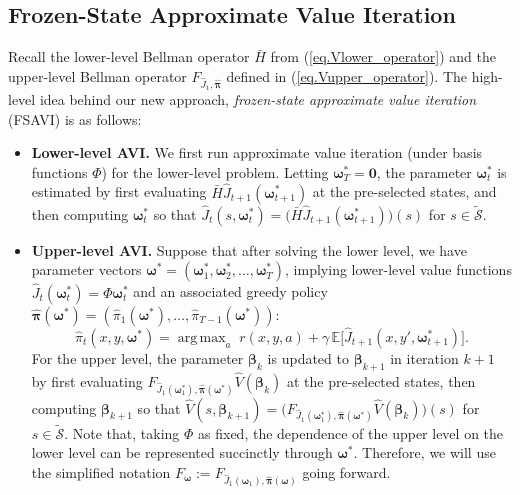 \documentclass[11pt, notitlepage]{article}
\DeclareMathOperator*{\argmax}{arg\,max}
\newcommand{\E}{\mathbb{E}}
\newcommand{\1}{\mathbbm{1}}
\begin{document}
\subsection{Frozen-State Approximate Value Iteration}
Recall the lower-level Bellman operator $\bar{H}$ from (\ref{eq.Vlower_operator}) and the upper-level Bellman operator $F_{\hat{J}_1, \hat{\boldsymbol{\pi}}}$ defined in (\ref{eq.Vupper_operator}). The high-level idea behind our new approach, \emph{frozen-state approximate value iteration} (FSAVI) is as follows:
\begin{itemize}
\item \textbf{Lower-level AVI.} We first run approximate value iteration (under basis functions $\Phi$) for the lower-level problem. Letting $\boldsymbol{\omega}_T^* = \mathbf{0}$, the parameter $\boldsymbol{\omega}^*_t$ is estimated by first evaluating $\bar{H} \hat{J}_{t+1}(\boldsymbol{\omega}_{t+1}^*) $ at the pre-selected states, and then computing $\boldsymbol{\omega}_t^*$ so that $\hat{J}_t(s,\boldsymbol{\omega}_t^*) = \bigl(\bar{H} \hat{J}_{t+1}(\boldsymbol{\omega}_{t+1}^*) \bigr) (s)$ for $s\in \tilde{\mathcal{S}}$.
\item \textbf{Upper-level AVI.} Suppose that after solving the lower level, we have parameter vectors $\boldsymbol{\omega}^* = (\boldsymbol{\omega}_1^*, \boldsymbol{\omega}_2^*, \ldots, \boldsymbol{\omega}_T^*)$, implying lower-level value functions $\hat{J}_t(\boldsymbol{\omega}_t^*) = \Phi \boldsymbol{\omega}_t^*$ and an associated greedy policy $\hat{\boldsymbol{\pi}}(\boldsymbol{\omega}^*) = (\hat{\pi}_1(\boldsymbol{\omega}^*), \ldots, \hat{\pi}_{T-1}(\boldsymbol{\omega}^*))$:
\begin{equation}
\hat{\pi}_t(x, y, \boldsymbol{\omega}^*) = \argmax_{a} \; r(x,y,a) + \gamma \, \E \bigl[\hat{J}_{t+1}(x,y', \boldsymbol{\omega}_{t+1}^*)\bigr].
\label{eq.greedy_linear}
\end{equation}
For the upper level, the parameter $\boldsymbol{\beta}_k$ is updated to $\boldsymbol{\beta}_{k+1}$ in iteration $k+1$ by first evaluating $F_{\hat{J}_1(\boldsymbol{\omega}_1^*), \hat{\boldsymbol{\pi}}(\boldsymbol{\omega}^*)} \hat{V} (\boldsymbol{\beta}_{k})$ at the pre-selected states, then computing $\boldsymbol{\beta}_{k+1}$ so that $\hat{V}(s,\boldsymbol{\beta}_{k+1}) = \bigl(F_{\hat{J}_1(\boldsymbol{\omega}_1^*), \hat{\boldsymbol{\pi}}(\boldsymbol{\omega}^*)} \hat{V} (\boldsymbol{\beta}_{k})\bigr)(s)$ for $s\in \tilde{\mathcal{S}}$. Note that, taking $\Phi$ as fixed, the dependence of the upper level on the lower level can be represented succinctly through $\boldsymbol{\omega}^*$. Therefore, we will use the simplified notation $F_{\boldsymbol{\omega}} := F_{\hat{J}_1(\boldsymbol{\omega}_1), \hat{\boldsymbol{\pi}}(\boldsymbol{\omega})}$ going forward.
\end{itemize}
\end{document}

